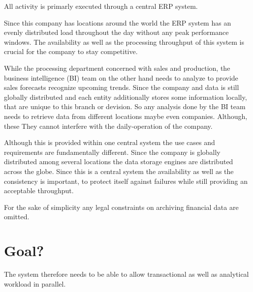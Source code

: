 
All activity is primarly executed through a central ERP system. 

Since this company has locations around the world the ERP system has an evenly distributed load throughout the day without any peak performance windows.
The availability as well as the processing throughput of this system is crucial for the company to stay competitive.

While the processing department concerned with sales and production, the business intelligence (BI) team on the other hand needs to analyze to provide sales forecasts recognize 
upcoming trends. Since the company and data is still globally distributed and each entity additionally stores some information locally, that are unique to this branch or devision. 
So any analysis done by the BI team needs to retrieve data from different locations maybe even companies. Although, these
They cannot interfere with the daily-operation of the company. 

Although this is provided within one central system the use cases and requirements are fundamentally different.
Since the company is globally distributed among several locations the data storage engines are distributed across the globe.
Since this is a central system the availability as well as the consistency is important, to protect itself against failures while still providing an acceptable throughput.


For the sake of simplicity any legal constraints on archiving financial data are omitted. 

\section{Goal?}
The system therefore needs to be able to allow transactional as well as analytical workload in parallel. 